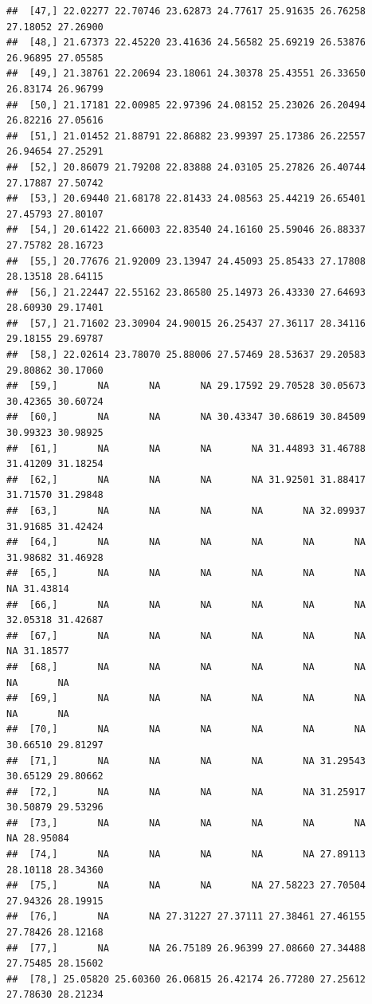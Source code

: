 \documentclass{article}\usepackage[]{graphicx}\usepackage[]{color}
\makeatletter
\newenvironment{kframe}{%
 \def\at@end@of@kframe{}%
 \ifinner\ifhmode%
  \def\at@end@of@kframe{\end{minipage}}%
  \begin{minipage}{\columnwidth}%
 \fi\fi%
 \def\FrameCommand##1{\hskip\@totalleftmargin \hskip-\fboxsep
 \colorbox{shadecolor}{##1}\hskip-\fboxsep
     \hskip-\linewidth \hskip-\@totalleftmargin \hskip\columnwidth}%
 \MakeFramed {\advance\hsize-\width
   \@totalleftmargin\z@ \linewidth\hsize
   \@setminipage}}%
 {\par\unskip\endMakeFramed%
 \at@end@of@kframe}
\newenvironment{knitrout}{}{} %
\makeatother
\begin{document}
\begin{knitrout}
\begin{kframe}
\begin{verbatim}
##  [47,] 22.02277 22.70746 23.62873 24.77617 25.91635 26.76258 27.18052 27.26900
##  [48,] 21.67373 22.45220 23.41636 24.56582 25.69219 26.53876 26.96895 27.05585
##  [49,] 21.38761 22.20694 23.18061 24.30378 25.43551 26.33650 26.83174 26.96799
##  [50,] 21.17181 22.00985 22.97396 24.08152 25.23026 26.20494 26.82216 27.05616
##  [51,] 21.01452 21.88791 22.86882 23.99397 25.17386 26.22557 26.94654 27.25291
##  [52,] 20.86079 21.79208 22.83888 24.03105 25.27826 26.40744 27.17887 27.50742
##  [53,] 20.69440 21.68178 22.81433 24.08563 25.44219 26.65401 27.45793 27.80107
##  [54,] 20.61422 21.66003 22.83540 24.16160 25.59046 26.88337 27.75782 28.16723
##  [55,] 20.77676 21.92009 23.13947 24.45093 25.85433 27.17808 28.13518 28.64115
##  [56,] 21.22447 22.55162 23.86580 25.14973 26.43330 27.64693 28.60930 29.17401
##  [57,] 21.71602 23.30904 24.90015 26.25437 27.36117 28.34116 29.18155 29.69787
##  [58,] 22.02614 23.78070 25.88006 27.57469 28.53637 29.20583 29.80862 30.17060
##  [59,]       NA       NA       NA 29.17592 29.70528 30.05673 30.42365 30.60724
##  [60,]       NA       NA       NA 30.43347 30.68619 30.84509 30.99323 30.98925
##  [61,]       NA       NA       NA       NA 31.44893 31.46788 31.41209 31.18254
##  [62,]       NA       NA       NA       NA 31.92501 31.88417 31.71570 31.29848
##  [63,]       NA       NA       NA       NA       NA 32.09937 31.91685 31.42424
##  [64,]       NA       NA       NA       NA       NA       NA 31.98682 31.46928
##  [65,]       NA       NA       NA       NA       NA       NA       NA 31.43814
##  [66,]       NA       NA       NA       NA       NA       NA 32.05318 31.42687
##  [67,]       NA       NA       NA       NA       NA       NA       NA 31.18577
##  [68,]       NA       NA       NA       NA       NA       NA       NA       NA
##  [69,]       NA       NA       NA       NA       NA       NA       NA       NA
##  [70,]       NA       NA       NA       NA       NA       NA 30.66510 29.81297
##  [71,]       NA       NA       NA       NA       NA 31.29543 30.65129 29.80662
##  [72,]       NA       NA       NA       NA       NA 31.25917 30.50879 29.53296
##  [73,]       NA       NA       NA       NA       NA       NA       NA 28.95084
##  [74,]       NA       NA       NA       NA       NA 27.89113 28.10118 28.34360
##  [75,]       NA       NA       NA       NA 27.58223 27.70504 27.94326 28.19915
##  [76,]       NA       NA 27.31227 27.37111 27.38461 27.46155 27.78426 28.12168
##  [77,]       NA       NA 26.75189 26.96399 27.08660 27.34488 27.75485 28.15602
##  [78,] 25.05820 25.60360 26.06815 26.42174 26.77280 27.25612 27.78630 28.21234

\end{verbatim}
\end{kframe}
\end{knitrout}
\end{document}
